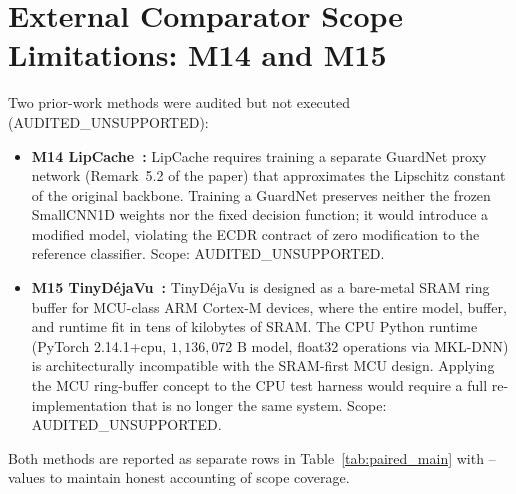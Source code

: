 \documentclass[11pt,oneside,a4paper]{report}
\newcommand{\code}[1]{{\small\upshape\ttfamily #1}}
\theoremstyle{remark}
\begin{document}
\section{External Comparator Scope Limitations: \code{M14} and \code{M15}}
Two prior-work methods were audited but not executed (\code{AUDITED\_UNSUPPORTED}):
\begin{itemize}[leftmargin=1.5em]
  \item \textbf{\code{M14} LipCache~\cite{xiang2026lipcache}:} LipCache requires training a separate \code{GuardNet} proxy network (Remark~5.2 of the paper) that approximates the Lipschitz constant of the original backbone. Training a GuardNet preserves neither the frozen \code{SmallCNN1D} weights nor the fixed decision function; it would introduce a modified model, violating the ECDR contract of zero modification to the reference classifier. Scope: \code{AUDITED\_UNSUPPORTED}.
  \item \textbf{\code{M15} TinyD\'ejaVu~\cite{tinydejavu}:} TinyD\'ejaVu is designed as a bare-metal SRAM ring buffer for MCU-class ARM Cortex-M devices, where the entire model, buffer, and runtime fit in tens of kilobytes of SRAM. The CPU Python runtime (\code{PyTorch 2.14.1+cpu}, $1{,}136{,}072\text{ B}$ model, \code{float32} operations via MKL-DNN) is architecturally incompatible with the SRAM-first MCU design. Applying the MCU ring-buffer concept to the CPU test harness would require a full re-implementation that is no longer the same system. Scope: \code{AUDITED\_UNSUPPORTED}.
\end{itemize}
Both methods are reported as separate rows in Table~\ref{tab:paired_main} with \code{--} values to maintain honest accounting of scope coverage.
\end{document}
